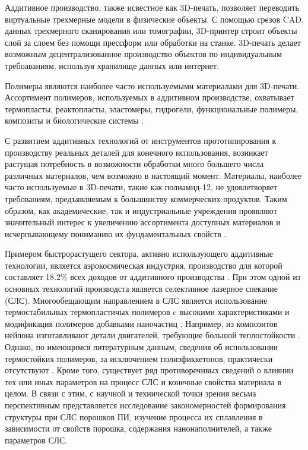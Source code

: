 

Аддитивное производство, также исвестное как 3D-печать, позволяет переводить виртуальные трехмерные модели в физические объекты. С помощью срезов CAD, данных трехмерного сканирования или томографии, 3D-принтер строит объекты слой за слоем без помощи прессформ или обработки на станке. 3D-печать делает возможным децентрализованное производство объектов по индивидуальным требоаваниям, используя хранилище данных или интернет. 

Полимеры являются наиболее часто используемыми материалами для 3D-печати. Ассортимент полимеров, используемых в аддитивном производстве, охватывает термопласты, реактопласты, эластомеры, гидрогели, функциональные полимеры, композиты и биологические системы \cite{3d-review}. 

С развитием аддитивных технологий от инструментов прототипирования к производству реальных деталей для конечного использования, возникает растущая потребность в возможности  обработки много большего числа различных материалов, чем возможно в настоящий момент. Материалы, наиболее часто используемые в 3D-печати, такие как полиамид-12, не удовлетворяет требованиям, предъявляемым к большинству коммерческих продуктов. Таким образом, как академические, так и индустриальные учреждения проявляют значительный интерес к увеличению ассортимента доступных материалов и исчерпывающему пониманию их фундаментальных свойств \cite{sls-material}.

Примером быстрорастущего сектора, активно использующего аддитивные технологии, является аэрокосмическая индустрия, производство для которой составляет 18.2\% всех доходов от аддитивного производства \cite{avia}. При этом одной из основных технологий производста является селективное лазерное спекание (СЛС). Многообещающим направлением в СЛС является использование  термостабильных термопластичых полимеров c высокими характеристиками и модификация полимеров добавками наночастиц \cite{conditions}.  Например, из композитов нейлона изготавливают детали двигателей, требующие большой теплостойкости \cite{avia}. Однако, по имеющимся литературным данным, сведения об использовании термостойких полимеров, за исключением полиэфиккетонов, практически отсутствуют
\cite{peek}. 
Кроме того, существует ряд противоречивых сведений о влиянии тех или иных параметров на процесс СЛС и конечные свойства материала в целом. В связи с этим, с научной и технической точки зрения весьма перспективным представляется исследование закономерностей формирования структуры при СЛС порошков ПИ, изучение процесса их сплавления в зависимости от свойств порошка, содержания нанонаполнителей, а также параметров СЛС.
\cite{yudin-red}
  
